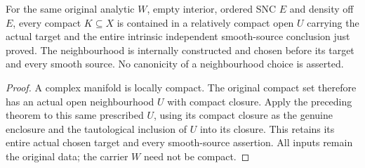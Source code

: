 \begin{corollary}
\label{hir:original-local-nonpure-natural-compact-neighbourhood}
\leanok
For the same original analytic $W$, empty interior, ordered SNC $E$
and density off $E$, every compact $K\subseteq X$ is contained in a
relatively compact open $U$ carrying the actual target and the entire
intrinsic independent smooth-source conclusion just proved. The
neighbourhood is internally constructed and chosen before its target
and every smooth source. No canonicity of a neighbourhood choice is
asserted.
\end{corollary}
\begin{proof}
A complex manifold is locally compact. The original compact set
therefore has an actual open neighbourhood $U$ with compact closure.
Apply the preceding theorem to this same prescribed $U$, using its
compact closure as the genuine enclosure and the tautological
inclusion of $U$ into its closure. This retains its entire actual
chosen target and every smooth-source assertion. All inputs remain
the original data; the carrier $W$ need not be compact.
\end{proof}
